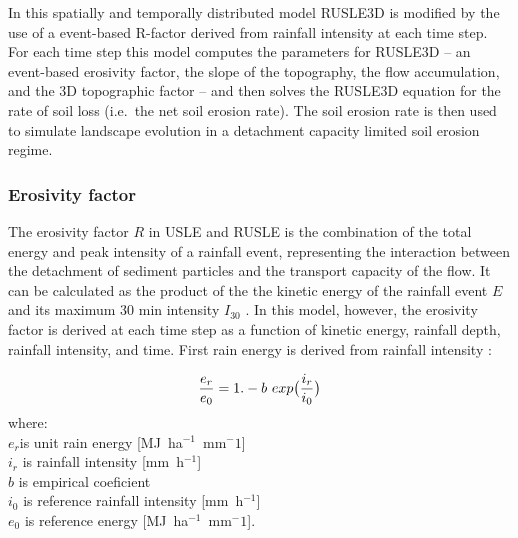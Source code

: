 \documentclass[gmd, manuscript]{copernicus}
\begin{document}
In this spatially and temporally distributed model 
RUSLE3D is modified by the use of a 
event-based R-factor derived from rainfall intensity at each time step.
For each time step this model computes the parameters for RUSLE3D -- 
an event-based erosivity factor,
the slope of the topography, the flow accumulation, and
the 3D topographic factor -- 
and then solves the RUSLE3D equation for the rate of soil loss 
(i.e.~the net soil erosion rate). 
The soil erosion rate is then used to simulate landscape evolution 
in a detachment capacity limited soil erosion regime.


\subsubsection{Erosivity factor}

The erosivity factor $R$ in USLE and RUSLE 
is the combination of the total energy 
and peak intensity of a rainfall event,
representing the interaction 
between the detachment of sediment particles
and the transport capacity of the flow. 
It can be calculated as the product of the 
the kinetic energy of the rainfall event $E$
and its maximum 30 \unit{min} intensity $I_{30}$
\citep{Brown1987,Renard1997,Panagos2015,Panagos2017}.
In this model, however, the erosivity factor
is derived at each time step as a function of
kinetic energy, rainfall depth, rainfall intensity, and time.
First rain energy is derived from rainfall intensity \citep{Brown1987,Yin2017}:

\begin{equation}
\label{eq:rain_energy}
{e_r \over e_0} = 1.- b ~ exp\bigl({i_r \over i_0} \bigr)
\end{equation}
%
{\small
\noindent
where: \\
\noindent
\hspace*{0.5em} $e_r$is unit rain energy [\unit{MJ~ha}$^{-1}$~\unit{mm}${^-1}$]\\
\hspace*{0.5em} $i_r$ is rainfall intensity [\unit{mm~h}$^{-1}$]\\
\hspace*{0.5em} $b$ is empirical coeficient\\
\hspace*{0.5em} $i_0$ is reference rainfall intensity [\unit{mm~h}$^{-1}$]\\
\hspace*{0.5em} $e_0$ is reference energy [\unit{MJ~ha}$^{-1}$~\unit{mm}${^-1}$]. 
}
\end{document}
